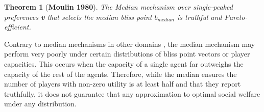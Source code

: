 \documentclass{article}
\newtheorem{theorem}{Theorem}[section]
\theoremstyle{definition}
\theoremstyle{definition}
\newcounter{protocol}
\begin{document}
\begin{theorem}[\textbf{Moulin 1980}]
The Median mechanism over single-peaked preferences \textbf{v} that selects the median bliss point $b_{median}$ is truthful and Pareto-efficient.
\end{theorem}



Contrary to median mechanisms in other domains \cite{DBLP:journals/corr/BlumrosenD16}, the median mechanism may perform very poorly under certain distributions of bliss point vectors or player capacities. This occurs when the capacity of a single agent far outweighs the capacity of the rest of the agents. Therefore, while the median ensures the number of players with non-zero utility is at least half and that they report truthfully, it does not guarantee that any approximation to optimal social welfare under any distribution.
\end{document}
